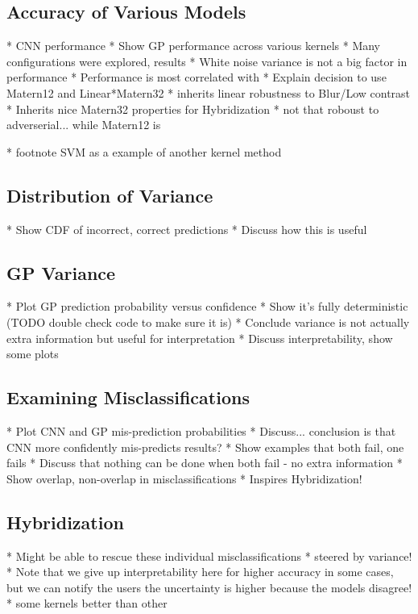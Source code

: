 \documentclass{article}
\begin{document}
\subsection{Accuracy of Various Models}
* CNN performance
* Show GP performance across various kernels
* Many configurations were explored, results
 * White noise variance is not a big factor in performance
 * Performance is most correlated with 
* Explain decision to use Matern12 and Linear*Matern32
 * inherits linear robustness to Blur/Low contrast
 * Inherits nice Matern32 properties for Hybridization
 * not that roboust to adverserial... while Matern12 is

* footnote SVM as a example of another kernel method

\subsection{Distribution of Variance}
* Show CDF of incorrect, correct predictions
* Discuss how this is useful

\subsection{GP Variance}
* Plot GP prediction probability versus confidence
* Show it's fully deterministic (TODO double check code to make sure it is)
* Conclude variance is not actually extra information but useful for interpretation
* Discuss interpretability, show some plots

\subsection{Examining Misclassifications}
* Plot CNN and GP mis-prediction probabilities
 * Discuss... conclusion is that CNN more confidently mis-predicts results?
* Show examples that both fail, one fails
* Discuss that nothing can be done when both fail - no extra information
* Show overlap, non-overlap in misclassifications
* Inspires Hybridization!

\subsection{Hybridization}
* Might be able to rescue these individual misclassifications
 * steered by variance!
 * Note that we give up interpretability here for higher accuracy in some cases, but we can notify the users the uncertainty is higher because the models disagree!	
 * some kernels better than other
\end{document}
